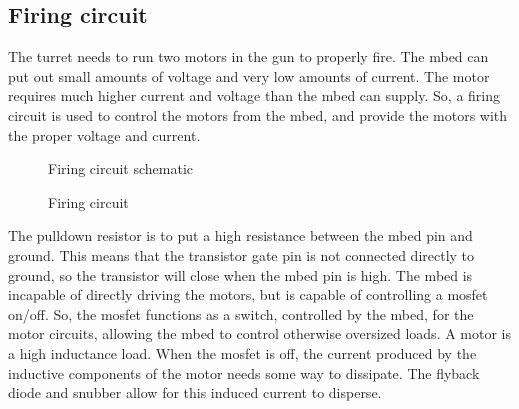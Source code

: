 ﻿\subsection{Firing circuit}
The turret needs to run two motors in the gun to properly fire. The mbed can put out small amounts of voltage and very low amounts of current. The motor requires much higher current and voltage than the mbed can supply. So, a firing circuit is used to control the  motors from the mbed, and provide the motors with the proper voltage and current.
\begin{figure}
\begin{center}
\end{center}
\caption{Firing circuit schematic}
\label{fig:1}
\end{figure}
  
\begin{figure}
\begin{center}
\end{center}
\caption{Firing circuit}
\label{fig:2}
\end{figure}

The pulldown resistor is to put a high resistance between the mbed pin and ground. This means that the transistor gate pin is not connected directly to ground, so the transistor will close when the mbed pin is high.
The mbed is incapable of directly driving the motors, but is capable of controlling a mosfet on/off. So, the mosfet functions as a switch, controlled by the mbed, for the motor circuits, allowing the mbed to control otherwise oversized loads.
A motor is a high inductance load. When the mosfet is off, the current produced by the inductive components of the motor needs some way to dissipate. The flyback diode and snubber allow for this induced current to disperse. 

